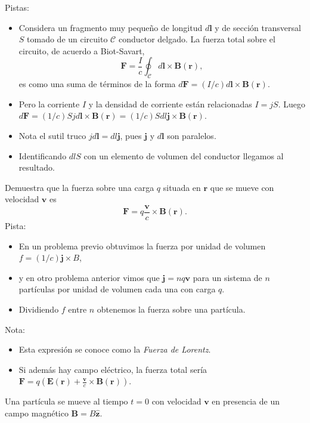\documentclass{exam}
\begin{document}
\begin{questions}
    Pistas:
    \begin{itemize}
    \item Considera un fragmento muy pequeño de
      longitud $d\bm l$ y de sección transversal $S$ tomado de un circuito $\mathcal
      C$ conductor delgado. La fuerza total
      sobre el circuito, de acuerdo a Biot-Savart,
      $$
      \bm F=\frac{I}{c}\oint_{\mathcal C} d\bm l\times\bm B(\bm r),
      $$
      es como una suma de términos de la forma
      $d\bm F=(I/c)d\bm l\times \bm B(\bm r)$.
    \item Pero la corriente $I$ y
      la densidad de corriente están relacionadas $I=jS$. Luego
      $d\bm F=(1/c)S j d\bm l\times \bm B(\bm r)=(1/c)S dl \bm j
      \times \bm B(\bm r)$.
    \item Nota el sutil truco $jd\bm l=dl\bm j$, pues $\bm j$ y $d\bm
      l$ son paralelos.
    \item Identificando $dlS$ con un elemento de volumen del conductor
      llegamos al resultado.
    \end{itemize}
  \question Demuestra que la fuerza sobre una carga $q$ situada en
    $\bm r$ que se mueve con velocidad $\bm v$ es
    $$
    \bm F=q\frac{\bm v}{c}\times\bm B(\bm r).
    $$
    Pista:
    \begin{itemize}
    \item En un problema previo obtuvimos la fuerza por unidad de
      volumen $f=(1/c)\bm j\times B$,
    \item y en otro problema anterior vimos que $\bm j=nq\bm v$ para
      un sistema de $n$ partículas por unidad de volumen cada una con
      carga $q$.
    \item Dividiendo $f$ entre $n$ obtenemos la fuerza sobre una partícula.
    \end{itemize}
    Nota:
    \begin{itemize}
    \item Esta expresión se conoce como la {\em Fuerza de Lorentz}.
    \item Si además hay campo eléctrico, la fuerza total sería $\bm
      F=q(\bm E(\bm r)+\frac{\bm v}{c}\times\bm B(\bm r))$.
    \end{itemize}

  \question Una partícula se mueve al tiempo $t=0$ con velocidad $\bm v$ en presencia
    de un campo magnético $\bm B=B\hat{\bm z}$.
\end{questions}
\end{document}
